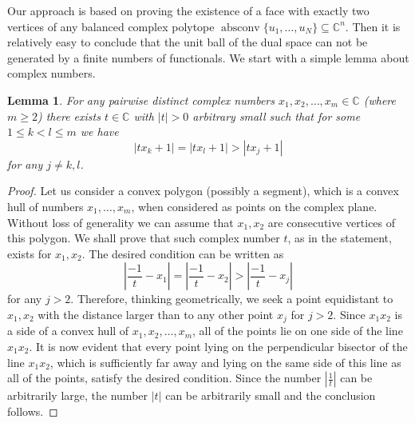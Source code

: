\documentclass[12pt, reqno]{amsart}
\newtheorem{lem}[twr]{Lemma}
\theoremstyle{definition}
\theoremstyle{remark}
\numberwithin{equation}{section}
\DeclareMathOperator{\absconv}{absconv}
\begin{document}
Our approach is based on proving the existence of a face with exactly two vertices of any balanced complex polytope $\absconv \{u_1, \ldots, u_N\} \subseteq \mathbb{C}^n$. Then it is relatively easy to conclude that the unit ball of the dual space can not be generated by a finite numbers of functionals. We start with a simple lemma about complex numbers.

\begin{lem}
\label{lemcomplex}
For any pairwise distinct complex numbers $x_1, x_2, \ldots, x_m \in \mathbb{C}$ (where $m \geq 2$) there exists $t \in \mathbb{C}$ with $|t|>0$ arbitrary small such that for some $1 \leq k < l \leq m$ we have
$$|tx_k+1|=|tx_l+1| > |tx_j+1|$$
for any $j \neq k, l$.
\end{lem}

\begin{proof}

Let us consider a convex polygon (possibly a segment), which is a convex hull of numbers $x_1, \ldots, x_m$, when considered as points on the complex plane. Without loss of generality we can assume that $x_1, x_2$ are consecutive vertices of this polygon. We shall prove that such complex number $t$, as in the statement, exists for $x_1, x_2$. The desired condition can be written as
$$\left | \frac{-1}{t} - x_1  \right | = \left | \frac{-1}{t} - x_2  \right |  > \left | \frac{-1}{t} - x_j  \right |$$
for any $j>2$. Therefore, thinking geometrically, we seek a point equidistant to $x_1, x_2$ with the distance larger than to any other point $x_j$ for $j>2$. Since $x_1x_2$ is a side of a convex hull of $x_1, x_2, \ldots, x_m$, all of the points lie on one side of the line $x_1x_2$. It is now evident that every point lying on the perpendicular bisector of the line $x_1x_2$, which is sufficiently far away and lying on the same side of this line as all of the points, satisfy the desired condition. Since the number $|\frac{1}{t}|$ can be arbitrarily large, the number $|t|$ can be arbitrarily small and the conclusion follows. 

\end{proof}
\end{document}
